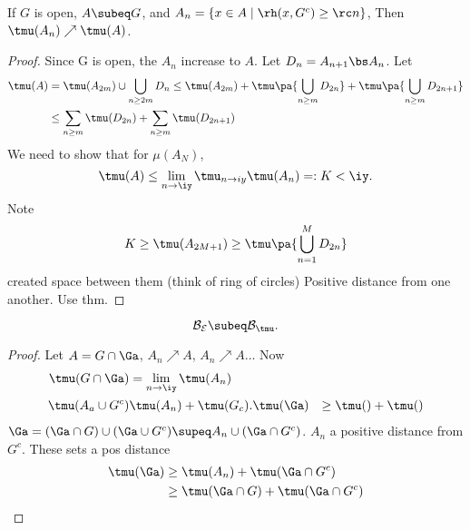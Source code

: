 \begin{lem}
If $G$ is open, $A\subeq G$, and $A_n=\{x\in A\mid \rh(x,G^c)\ge \rc n\}$,
 Then $\tmu (A_n)\nearrow \tmu(A)$. %
\end{lem}
\begin{proof}
Since G is open, the $A_n$ increase to $A$. Let $D_n=A_{n+1}\bs A_n$. Let 
\begin{align*}
\tmu(A)&=\tmu(A_{2m})\cup \bigcup_{n\ge 2m} D_n
\le \tmu(A_{2m})+\tmu\pa{
\bigcup_{n\ge m} D_{2n}}
+\tmu\pa{\bigcup_{n\ge m} D_{2n+1}}\\
&\le \sum_{n\ge m}\tmu(D_{2n})+\sum_{n\ge m}\tmu (D_{2n+1})
\end{align*}
We need to show that for $\mu(A_N)$,
\[
\tmu(A)\le \lim_{n\to \iy} \tmu_{n\to iy} \tmu (A_n)=:K<\iy.
\]
Note
\[
K\ge \tmu(A_{2M+1})\ge \tmu\pa{
\bigcup_{n=1}^M D_{2n}}
\]
created space between them (think of ring of circles)
Positive distance from one another. Use thm.
\end{proof}
\begin{lem}
\[
\cal B_E\subeq \cal B_{\tmu}.
\]
\end{lem}
\begin{proof}
Let $A=G\cap \Ga$, $A_n\nearrow A$, $A_n\nearrow A$...
Now
\begin{align*}
\tmu(G\cap \Ga)&=\lim_{n\to \iy} \tmu (A_n)\\
\tmu(A_a\cup G^c)&\tmu(A_n)+\tmu(G_c).
\tmu(\Ga)&\ge \tmu() +\tmu()
\end{align*}
$\Ga=(\Ga\cap G)\cup (\Ga\cup G^c)\supeq A_n\cup (\Ga\cap G^c)$. 
$A_n$ a positive distance from $G^c$.
These sets a pos distance
\begin{align*}
\tmu(\Ga)&\ge \tmu(A_n)+\tmu(\Ga\cap G^c)\\
&\ge \tmu(\Ga\cap G)+\tmu(\Ga\cap G^c)
\end{align*}
\end{proof}
